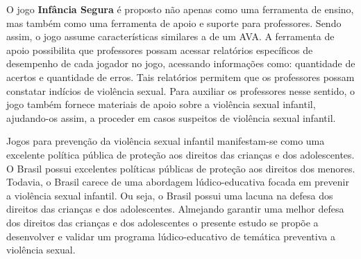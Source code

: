 O jogo \textbf{Infância Segura} é proposto não apenas como uma ferramenta de ensino, mas também como uma ferramenta de apoio e suporte para professores. Sendo assim, o jogo assume características similares a de um \ac{AVA}. A ferramenta de apoio possibilita que professores possam acessar relatórios específicos de desempenho de cada jogador no jogo, acessando informações como: quantidade de acertos e quantidade de erros. Tais relatórios permitem que os professores possam constatar indícios de violência sexual. Para auxiliar os professores nesse sentido, o jogo também fornece materiais de apoio sobre a violência sexual infantil, ajudando-os assim, a proceder em casos suspeitos de violência sexual infantil.


Jogos para prevenção da violência sexual infantil manifestam-se como uma excelente política pública de proteção aos direitos das crianças e dos adolescentes. O Brasil possui excelentes políticas públicas de proteção aos direitos dos menores. Todavia, o Brasil carece de uma abordagem lúdico-educativa focada em prevenir a violência sexual infantil. Ou seja, o Brasil possui uma lacuna na defesa dos direitos das crianças e dos adolescentes. Almejando garantir uma melhor defesa dos direitos das crianças e dos adolescentes o presente estudo se propõe a desenvolver e validar um programa lúdico-educativo de temática preventiva a violência sexual. 

